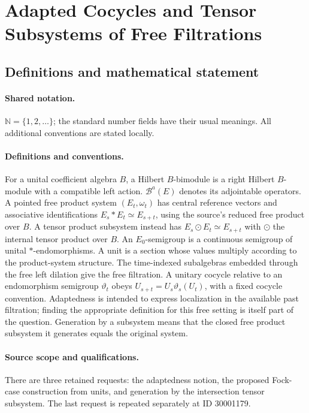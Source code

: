\documentclass[11pt]{article}
\begin{document}
\section{Adapted Cocycles and Tensor Subsystems of Free Filtrations}\label{statement}

\subsection{Definitions and mathematical statement}

\paragraph{Shared notation.}$\mathbb N=\{1,2,\ldots\}$; the standard number fields have their usual meanings. All additional conventions are stated locally.


\paragraph{Definitions and conventions.} For a unital coefficient algebra $B$, a Hilbert $B$-bimodule is a right Hilbert $B$-module with a compatible left action. $\mathcal B^a(E)$ denotes its adjointable operators. A pointed free product system $(E_t,\omega_t)$ has central reference vectors and associative identifications $E_s*E_t\simeq E_{s+t}$, using the source's reduced free product over $B$. A tensor product subsystem instead has $E_s\odot E_t\simeq E_{s+t}$ with $\odot$ the internal tensor product over $B$. An $E_0$-semigroup is a continuous semigroup of unital $*$-endomorphisms. A unit is a section whose values multiply according to the product-system structure. The time-indexed subalgebras embedded through the free left dilation give the free filtration. A unitary cocycle relative to an endomorphism semigroup $\vartheta_t$ obeys $U_{s+t}=U_s\vartheta_s(U_t)$, with a fixed cocycle convention. Adaptedness is intended to express localization in the available past filtration; finding the appropriate definition for this free setting is itself part of the question. Generation by a subsystem means that the closed free product subsystem it generates equals the original system.

\paragraph{Source scope and qualifications.} There are three retained requests: the adaptedness notion, the proposed Fock-case construction from units, and generation by the intersection tensor subsystem. The last request is repeated separately at ID 30001179.
\end{document}
